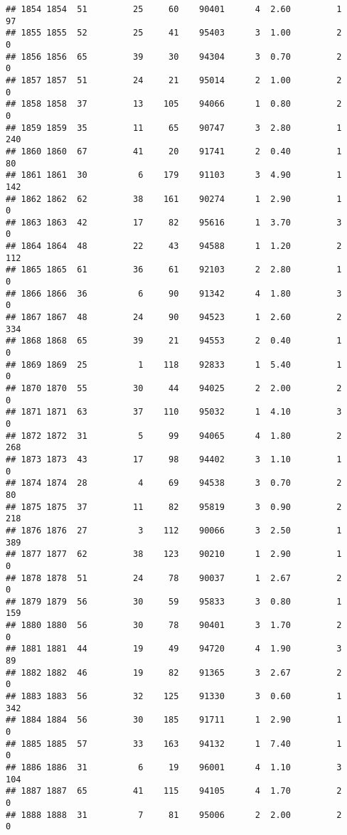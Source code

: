 \documentclass[
]{article}
\begin{document}
\begin{verbatim}
## 1854 1854  51         25     60    90401      4  2.60         1       97
## 1855 1855  52         25     41    95403      3  1.00         2        0
## 1856 1856  65         39     30    94304      3  0.70         2        0
## 1857 1857  51         24     21    95014      2  1.00         2        0
## 1858 1858  37         13    105    94066      1  0.80         2        0
## 1859 1859  35         11     65    90747      3  2.80         1      240
## 1860 1860  67         41     20    91741      2  0.40         1       80
## 1861 1861  30          6    179    91103      3  4.90         1      142
## 1862 1862  62         38    161    90274      1  2.90         1        0
## 1863 1863  42         17     82    95616      1  3.70         3        0
## 1864 1864  48         22     43    94588      1  1.20         2      112
## 1865 1865  61         36     61    92103      2  2.80         1        0
## 1866 1866  36          6     90    91342      4  1.80         3        0
## 1867 1867  48         24     90    94523      1  2.60         2      334
## 1868 1868  65         39     21    94553      2  0.40         1        0
## 1869 1869  25          1    118    92833      1  5.40         1        0
## 1870 1870  55         30     44    94025      2  2.00         2        0
## 1871 1871  63         37    110    95032      1  4.10         3        0
## 1872 1872  31          5     99    94065      4  1.80         2      268
## 1873 1873  43         17     98    94402      3  1.10         1        0
## 1874 1874  28          4     69    94538      3  0.70         2       80
## 1875 1875  37         11     82    95819      3  0.90         2      218
## 1876 1876  27          3    112    90066      3  2.50         1      389
## 1877 1877  62         38    123    90210      1  2.90         1        0
## 1878 1878  51         24     78    90037      1  2.67         2        0
## 1879 1879  56         30     59    95833      3  0.80         1      159
## 1880 1880  56         30     78    90401      3  1.70         2        0
## 1881 1881  44         19     49    94720      4  1.90         3       89
## 1882 1882  46         19     82    91365      3  2.67         2        0
## 1883 1883  56         32    125    91330      3  0.60         1      342
## 1884 1884  56         30    185    91711      1  2.90         1        0
## 1885 1885  57         33    163    94132      1  7.40         1        0
## 1886 1886  31          6     19    96001      4  1.10         3      104
## 1887 1887  65         41    115    94105      4  1.70         2        0
## 1888 1888  31          7     81    95006      2  2.00         2        0

\end{verbatim}
\end{document}
